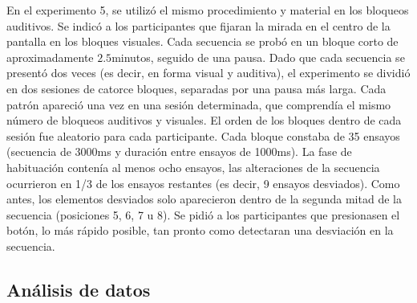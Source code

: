
En el experimento 5, se utilizó el mismo procedimiento y material en los bloqueos auditivos. Se indicó a los participantes que fijaran la mirada en el centro de la pantalla en los bloques visuales. Cada secuencia se probó en un bloque corto de aproximadamente $2.5$minutos, seguido de una pausa. Dado que cada secuencia se presentó dos veces (es decir, en forma visual y auditiva), el experimento se dividió en dos sesiones de catorce bloques, separadas por una pausa más larga. Cada patrón apareció una vez en una sesión determinada, que comprendía el mismo número de bloqueos auditivos y visuales. El orden de los bloques dentro de cada sesión fue aleatorio para cada participante. Cada bloque constaba de 35 ensayos (secuencia de 3000ms y duración entre ensayos de 1000ms). La fase de habituación contenía al menos ocho ensayos, las alteraciones de la secuencia ocurrieron en 1/3 de los ensayos restantes (es decir, 9 ensayos desviados). Como antes, los elementos desviados solo aparecieron dentro de la segunda mitad de la secuencia (posiciones 5, 6, 7 u 8). Se pidió a los participantes que presionasen el botón, lo más rápido posible, tan pronto como detectaran una desviación en la secuencia.

\subsection{Análisis de datos}



